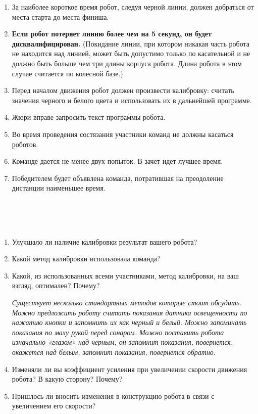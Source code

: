 \begin{enumerate}
	\item За наиболее короткое время робот, следуя черной линии, должен добраться от места старта до места финиша.
	\item  {\bfseries Если робот потеряет линию более чем на 5 секунд, он будет дисквалифицирован.} (Покидание линии, при котором никакая часть робота не находится над линией, может быть допустимо только по касательной и не должно быть больше чем три длины корпуса робота. Длина робота в этом случае считается по колесной базе.)
	\item Перед началом движения робот должен произвести  калибровку: считать значения черного и белого цвета и использовать их в дальнейшей программе.
	\item Жюри вправе запросить текст программы робота. 
	\item Во время проведения состязания участники команд не должны касаться роботов.
	\item Команде дается не менее двух попыток. В зачет идет лучшее время. 
	\item Победителем будет объявлена команда, потратившая на преодоление дистанции наименьшее время.\\\\
\end{enumerate}

{\hypertarget{lesson17x3}{}}\\\\

\begin{enumerate}
	\item Улучшало ли наличие калибровки результат вашего робота?
	\item Какой метод калибровки использовала команда?
	\item Какой, из использованных всеми участниками, метод калибровки, на ваш взгляд, оптимален? Почему?
	
	
	{\slshape Существует несколько стандартных методов которые стоит обсудить. Можно предложить роботу считать показания датчика освещенности по нажатию кнопки и запомнить их как черный и белый. Можно запоминать показания по маху рукой перед сонаром. Можно поставить робота изначально «глазом» над черным, он  запомнит показания, повернется, окажется над белым, запомнит показания, повернется обратно.}
	\item Изменяли ли вы коэффициент усиления при увеличении скорости движения робота? В какую сторону? Почему?
	\item Пришлось ли вносить изменения в конструкцию робота в связи с увеличением его скорости?\\\\
\end{enumerate}

